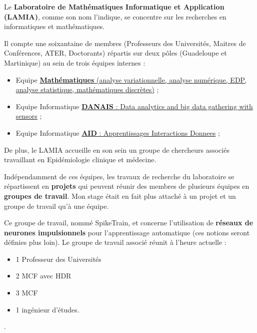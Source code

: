 Le \textbf{Laboratoire de Mathématiques Informatique et Application
(LAMIA)}, comme son nom l'indique, se concentre sur les recherches en
informatiques et mathématiques.

Il compte une soixantaine de membres (Professeurs des Universités,
Maitres de Conférences, ATER, Doctorants) répartis sur deux pôles
(Guadeloupe et Martinique) au sein de trois équipes internes :

\begin{itemize}
\tightlist
\item
  Equipe
  \href{http://lamia.univ-ag.fr/index.php?page=equipe-mathematiques}{\textbf{Mathématiques}
  (analyse variationnelle, analyse numérique, EDP, analyse statistique,
  mathématiques discrètes)} ;
\item
  Equipe Informatique
  \href{http://lamia.univ-ag.fr/index.php?page=equipe-danais}{\textbf{DANAIS}
  : Data analytics and big data gathering with sensors} ;
\item
  Equipe Informatique
  \href{http://lamia.univ-ag.fr/index.php?page=equipe-aid}{\textbf{AID}
  : Apprentissages Interactions Donnees} ;
\end{itemize}

De plus, le LAMIA accueille en son sein un groupe de chercheurs associés
travaillant en Epidémiologie clinique et médecine.


Indépendamment de ces équipes, les travaux de recherche du laboratoire
se répartissent en \textbf{projets} qui peuvent réunir des membres de
plusieurs équipes en \textbf{groupes de travail}. Mon stage était en
fait plus attaché à un projet et un groupe de travail qu'à une équipe.

Ce groupe de travail, nommé SpikeTrain,  et
concerne l'utilisation de \textbf{réseaux de neurones impulsionnels}
pour l'apprentissage automatique (ces notions seront définies plus
loin). Le groupe de travail associé réunit à l'heure actuelle :

\begin{itemize}
\tightlist
\item
  1 Professeur des Universités
\item
  2 MCF avec HDR
\item
  3 MCF
\item
  1 ingénieur d'études.
\end{itemize}.

